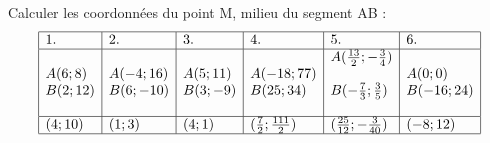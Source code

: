 \begin{solution}
Calculer les coordonnées du point M, milieu du segment AB :
$$
\begin{array}{|l|l|l|l|l|l|}
\hline
1.                                                           & 2.                                                               & 3.                                                            & 4.                                                               & 5.                                                                                                                                                                        & 6.                                                             \\ \hline
\begin{array}[c]{@{}l@{}}A(6 ;8)\\   B(2 ;12)\end{array} & \begin{array}[c]{@{}l@{}}A(- 4 ;16)\\   B(6;- 10)\end{array} & \begin{array}[c]{@{}l@{}}A(5 ;11)\\   B(3;- 9)\end{array} & \begin{array}[c]{@{}l@{}}A(- 18 ;77)\\   B(25;34)\end{array} & \begin{array}[c]{@{}l@{}}       A(\frac{13}{2};-\frac{3}{4})\\    \\      B(-\frac{7}{3};\frac{3}{5})\\    \\   \end{array} & \begin{array}[c]{@{}l@{}}A(0 ;0)\\   B(- 16;24)\end{array} \\ \hline
(4 ;10)                                                      & (1;3)                                                            & (4;1)                                                         & (\frac{7}{2};\frac{111}{2})                                & (\frac{25}{12};-\frac{3}{40})                                                                                                                                       & (- 8;12)                                                       \\ \hline
\end{array}
$$
\end{solution}

